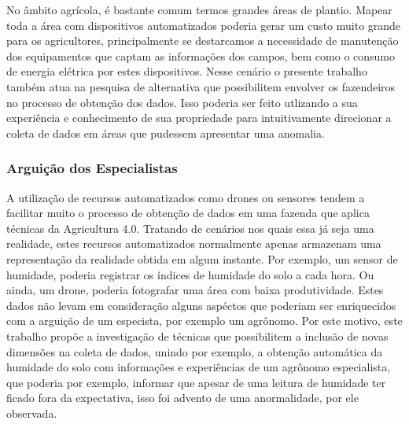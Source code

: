 \documentclass[12pt]{article}
\begin{document}
No âmbito agrícola, é bastante comum termos grandes áreas de plantio. Mapear toda a área com dispositivos automatizados poderia gerar um custo muito grande para os agricultores, principalmente se destarcamos a necessidade de manutenção dos equipamentos que captam as informações dos campos, bem como o consumo de energia elétrica por estes dispositivos. Nesse cenário o presente trabalho também atua na pesquisa de alternativa que possibilitem envolver os fazendeiros no processo de obtenção dos dados. Isso poderia ser feito utlizando a sua experiência e conhecimento de sua propriedade para intuitivamente direcionar a coleta de dados em áreas que pudessem apresentar uma anomalia.

\subsubsection{Arguição dos Especialistas}
\label{subsubsec:arquicao_especialistas}


A utilização de recursos automatizados como drones ou sensores tendem a facilitar muito o processo de obtenção de dados em uma fazenda que aplica técnicas da Agricultura 4.0. Tratando de cenários nos quais essa já seja uma realidade, estes recursos automatizados normalmente apenas armazenam uma representação da realidade obtida em algum instante. Por exemplo, um sensor de humidade, poderia registrar os índices de humidade do solo a cada hora. Ou ainda, um drone, poderia fotografar uma área com baixa produtividade. Estes dados não levam em consideração alguns aspéctos que poderiam ser enriquecidos com a arguição de um especista, por exemplo um agrônomo. Por este motivo, este trabalho propõe a investigação de técnicas que possibilitem a inclusão de novas dimensões na coleta de dados, unindo por exemplo, a obtenção automática da humidade do solo com informações e experiências de um agrônomo especialista, que poderia por exemplo, informar que apesar de uma leitura de humidade ter ficado fora da expectativa, isso foi advento de uma anormalidade, por ele observada.

\end{document}
